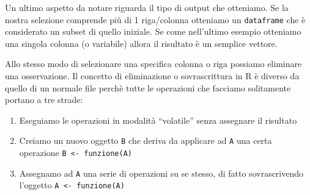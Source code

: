\documentclass[
]{book}
\newenvironment{Shaded}{\begin{snugshade}}{\end{snugshade}}
\newcommand{\CommentTok}[1]{\textcolor[rgb]{0.56,0.35,0.01}{\textit{#1}}}
\newcommand{\DecValTok}[1]{\textcolor[rgb]{0.00,0.00,0.81}{#1}}
\newcommand{\KeywordTok}[1]{\textcolor[rgb]{0.13,0.29,0.53}{\textbf{#1}}}
\newcommand{\NormalTok}[1]{#1}
\newcommand{\OperatorTok}[1]{\textcolor[rgb]{0.81,0.36,0.00}{\textbf{#1}}}
\newcommand{\StringTok}[1]{\textcolor[rgb]{0.31,0.60,0.02}{#1}}
\providecommand{\tightlist}{%
  \setlength{\itemsep}{0pt}\setlength{\parskip}{0pt}}
\begin{document}
Un ultimo aspetto da notare riguarda il tipo di output che otteniamo. Se la nostra selezione comprende più di 1 riga/colonna otteniamo un \texttt{dataframe} che è considerato un subset di quello iniziale. Se come nell'ultimo esempio otteniamo una singola colonna (o variabile) allora il risultato è un semplice vettore.

\begin{Shaded}
\end{Shaded}

Allo stesso modo di selezionare una specifica colonna o riga possiamo eliminare una osservazione. Il concetto di eliminazione o sovrascrittura in R è diverso da quello di un normale file perchè tutte le operazioni che facciamo solitamente portano a tre strade:

\begin{enumerate}
\def\labelenumi{\arabic{enumi}.}
\tightlist
\item
  Eseguiamo le operazioni in modalità ``volatile'' senza assegnare il risultato
\item
  Creiamo un nuovo oggetto \texttt{B} che deriva da applicare ad \texttt{A} una certa operazione \texttt{B\ \textless{}-\ funzione(A)}
\item
  Assegnamo ad \texttt{A} una serie di operazioni su se stesso, di fatto sovrascrivendo l'oggetto \texttt{A\ \textless{}-\ funzione(A)}
\end{enumerate}
\end{document}
